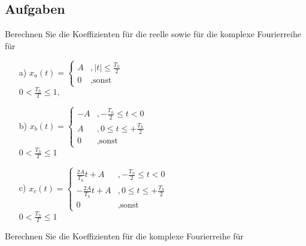 \documentclass[11pt,a4paper,DIV=12]{scrartcl}
\begin{document}
\subsection{Aufgaben}
%
Berechnen Sie die Koeffizienten für die reelle sowie für die komplexe Fourierreihe für
%
%
\begin{itemize}
	\item[a) ] $x_{a}(t)=
				\begin{cases}
					A &,|t|\leq\frac{T_h}{2}\\
					0 &,\text{sonst}
				\end{cases}$\\
				$0<\frac{T_h}{T}\leq 1,$
	\item[b) ] $x_{b}(t)=
				\begin{cases}
					-A &,-\frac{T_h}{2}\leq t < 0\\
					A &,0 \leq t \leq +\frac{T_h}{2}\\
					0 &,\text{sonst}
				\end{cases}$\\
				$0 < \frac{T_h}{T} \leq 1$
	\item[c) ] $x_c(t)=
				\begin{cases}
					\frac{2A}{T_h}t+A&,-\frac{T_h}{2}\leq t <0\\
					-\frac{2A}{T_h}t+A&,0\leq t \leq +\frac{T_h}{2}\\
					0&,\text{sonst}
				\end{cases}$\\
				$0<\frac{T_h}{T}\leq 1$
\end{itemize}
%
%
Berechnen Sie die Koeffizienten für die komplexe Fourierreihe für
%
\end{document}
